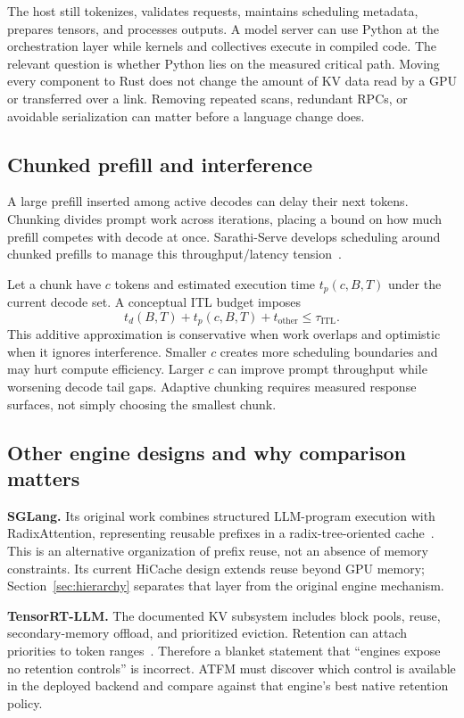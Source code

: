 The host still tokenizes, validates requests, maintains scheduling metadata,
prepares tensors, and processes outputs. A model server can use Python at the
orchestration layer while kernels and collectives execute in compiled code.
The relevant question is whether Python lies on the measured critical path.
Moving every component to Rust does not change the amount of KV data read by a
GPU or transferred over a link. Removing repeated scans, redundant RPCs, or
avoidable serialization can matter before a language change does.

\subsection{Chunked prefill and interference}
A large prefill inserted among active decodes can delay their next tokens.
Chunking divides prompt work across iterations, placing a bound on how much
prefill competes with decode at once. Sarathi-Serve develops scheduling around
chunked prefills to manage this throughput/latency tension~\cite{sarathi}.

Let a chunk have $c$ tokens and estimated execution time $t_p(c,B,T)$ under the
current decode set. A conceptual ITL budget imposes
\begin{equation}
 t_d(B,T)+t_p(c,B,T)+t_{\mathrm{other}}\le\tau_{\mathrm{ITL}}.
\end{equation}
This additive approximation is conservative when work overlaps and optimistic
when it ignores interference. Smaller $c$ creates more scheduling boundaries
and may hurt compute efficiency. Larger $c$ can improve prompt throughput while
worsening decode tail gaps. Adaptive chunking requires measured response surfaces,
not simply choosing the smallest chunk.

\subsection{Other engine designs and why comparison matters}
\textbf{SGLang.} Its original work combines structured LLM-program execution
with RadixAttention, representing reusable prefixes in a radix-tree-oriented
cache~\cite{sglang}. This is an alternative organization of prefix reuse, not
an absence of memory constraints. Its current HiCache design extends reuse
beyond GPU memory; Section~\ref{sec:hierarchy} separates that layer from the
original engine mechanism.

\textbf{TensorRT-LLM.} The documented KV subsystem includes block pools, reuse,
secondary-memory offload, and prioritized eviction. Retention can attach
priorities to token ranges~\cite{trt}. Therefore a blanket statement that
``engines expose no retention controls'' is incorrect. ATFM must discover which
control is available in the deployed backend and compare against that engine's
best native retention policy.

